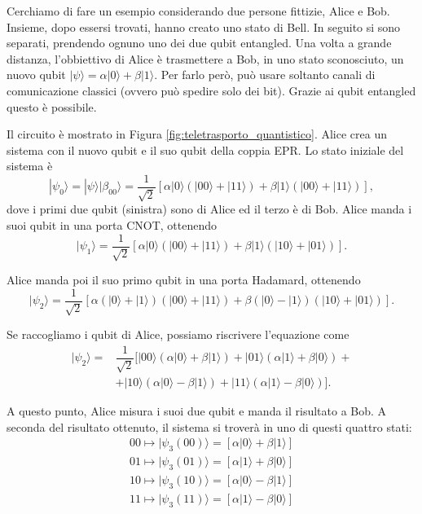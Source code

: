 Cerchiamo di fare un esempio considerando due persone fittizie, Alice e Bob.
Insieme, dopo essersi trovati, hanno creato uno stato di Bell.
In seguito si sono separati, prendendo ognuno uno dei due qubit entangled.
Una volta a grande distanza, l'obbiettivo di Alice è trasmettere a Bob, in uno stato sconosciuto, un nuovo qubit $|\psi \rangle=\alpha |0\rangle + \beta |1\rangle$.
Per farlo però, può usare soltanto canali di comunicazione classici (ovvero può spedire solo dei bit).
Grazie ai qubit entangled questo è possibile.

Il circuito è mostrato in Figura \ref{fig:teletrasporto_quantistico}.
Alice crea un sistema con il nuovo qubit e il suo qubit della coppia EPR.
Lo stato iniziale del sistema è
\begin{equation}
    |\psi_0\rangle = |\psi\rangle |\beta_{00}\rangle = \dfrac{1}{\sqrt{2}}[\alpha|0\rangle(|00\rangle + |11\rangle)+\beta|1\rangle(|00\rangle + |11\rangle)],
\end{equation}
dove i primi due qubit (sinistra) sono di Alice ed il terzo è di Bob.
Alice manda i suoi qubit in una porta CNOT, ottenendo
\begin{equation}
    |\psi_1\rangle = \dfrac{1}{\sqrt{2}}[\alpha|0\rangle (|00\rangle + |11\rangle)+\beta|1\rangle (|10\rangle + |01\rangle)].
\end{equation}

Alice manda poi il suo primo qubit in una porta Hadamard, ottenendo
\begin{equation}
    |\psi_2\rangle = \dfrac{1}{\sqrt{2}}[\alpha(|0\rangle + |1\rangle)(|00\rangle + |11\rangle) + \beta(|0\rangle - |1\rangle)(|10\rangle + |01\rangle)].
\end{equation}

Se raccogliamo i qubit di Alice, possiamo riscrivere l'equazione come
\begin{equation}
    \begin{split}
    |\psi_2\rangle =
    &\dfrac{1}{\sqrt{2}}[|00\rangle (\alpha|0\rangle + \beta|1\rangle)+|01\rangle(\alpha|1\rangle+\beta|0\rangle)+\\&+|10\rangle(\alpha|0\rangle-\beta|1\rangle)+|11\rangle(\alpha|1\rangle-\beta|0\rangle)].
    \end{split}
\end{equation}

A questo punto, Alice misura i suoi due qubit e manda il risultato a Bob. A seconda del risultato ottenuto, il sistema si troverà in uno di questi quattro stati:
\begin{gather}
 00 \longmapsto |\psi_3(00)\rangle = [\alpha|0\rangle + \beta|1\rangle]\\
 01 \longmapsto |\psi_3(01)\rangle = [\alpha|1\rangle + \beta|0\rangle]\\
 10 \longmapsto |\psi_3(10)\rangle = [\alpha|0\rangle - \beta|1\rangle]\\
 11 \longmapsto |\psi_3(11)\rangle = [\alpha|1\rangle - \beta|0\rangle]
\end{gather}

